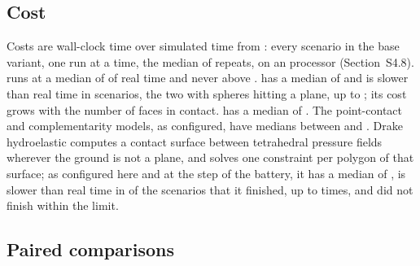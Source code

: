 \subsection{Cost}\label{sec:cost}


Costs are wall-clock time over simulated time from : every scenario in the
base variant, one run at a time, the median of  repeats, on an
 processor (Section~S4.8).  runs at a median of
 of real time and never above .
 has a median of  and is slower than real time
in  scenarios, the two with spheres hitting a plane, up to
; its cost grows with the number of faces in contact. 
has a median of . The point-contact and complementarity models, as
configured, have medians between  and
. Drake hydroelastic computes a contact surface between tetrahedral
pressure fields wherever the ground is not a plane, and solves one constraint per polygon of
that surface; as configured here and at the step of the battery, it has a median of
, is slower than real time in  of the
 scenarios that it finished, up to  times, and did
not finish  within the limit.

\subsection{Paired comparisons}\label{sec:ratios}

